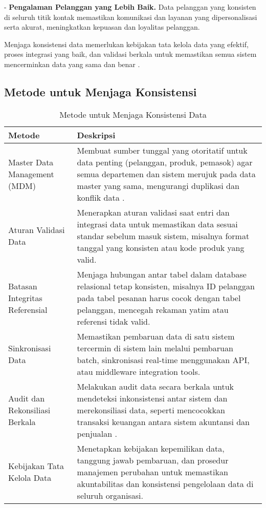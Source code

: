 - \textbf{Pengalaman Pelanggan yang Lebih Baik.} Data pelanggan yang konsisten di seluruh titik kontak memastikan komunikasi dan layanan yang dipersonalisasi serta akurat, meningkatkan kepuasan dan loyalitas pelanggan.

Menjaga konsistensi data memerlukan kebijakan tata kelola data yang efektif, proses integrasi yang baik, dan validasi berkala untuk memastikan semua sistem mencerminkan data yang sama dan benar \cite{ottoo2013data}.

\subsection{Metode untuk Menjaga Konsistensi}

\begin{table}[h]
	\centering
	\caption{Metode untuk Menjaga Konsistensi Data}
	\begin{tabular}{|p{}|p{}|}
		\hline
		\textbf{Metode} & \textbf{Deskripsi} \\
		\hline
		Master Data Management (MDM) & Membuat sumber tunggal yang otoritatif untuk data penting (pelanggan, produk, pemasok) agar semua departemen dan sistem merujuk pada data master yang sama, mengurangi duplikasi dan konflik data \cite{otto2011mdm}. \\
		\hline
		Aturan Validasi Data & Menerapkan aturan validasi saat entri dan integrasi data untuk memastikan data sesuai standar sebelum masuk sistem, misalnya format tanggal yang konsisten atau kode produk yang valid. \\
		\hline
		Batasan Integritas Referensial & Menjaga hubungan antar tabel dalam database relasional tetap konsisten, misalnya ID pelanggan pada tabel pesanan harus cocok dengan tabel pelanggan, mencegah rekaman yatim atau referensi tidak valid. \\
		\hline
		Sinkronisasi Data & Memastikan pembaruan data di satu sistem tercermin di sistem lain melalui pembaruan batch, sinkronisasi real-time menggunakan API, atau middleware integration tools. \\
		\hline
		Audit dan Rekonsiliasi Berkala & Melakukan audit data secara berkala untuk mendeteksi inkonsistensi antar sistem dan merekonsiliasi data, seperti mencocokkan transaksi keuangan antara sistem akuntansi dan penjualan \cite{laurila1999data}. \\
		\hline
		Kebijakan Tata Kelola Data & Menetapkan kebijakan kepemilikan data, tanggung jawab pembaruan, dan prosedur manajemen perubahan untuk memastikan akuntabilitas dan konsistensi pengelolaan data di seluruh organisasi. \\
		\hline
	\end{tabular}
	\label{tab:metode-konsistensi-data}
\end{table}

